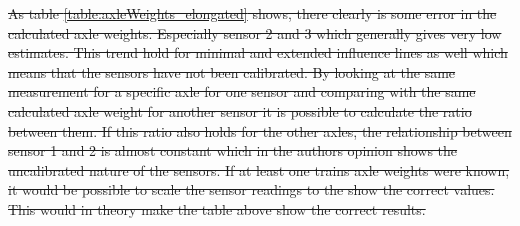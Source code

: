 \sout{As table \ref{table:axleWeights_elongated} shows, there clearly is some error in the calculated axle weights. Especially sensor 2 and 3 which generally gives very low estimates. This trend hold for minimal and extended influence lines as well which means that the sensors have not been calibrated. By looking at the same measurement for a specific axle for one sensor and comparing with the same calculated axle weight for another sensor it is possible to calculate the ratio between them. If this ratio also holds for the other axles, the relationship between sensor 1 and 2 is almost constant which in the authors opinion shows the uncalibrated nature of the sensors.
If at least one trains axle weights were known, it would be possible to scale the sensor readings to the show the correct values. This would in theory make the table above show the correct results.
}
